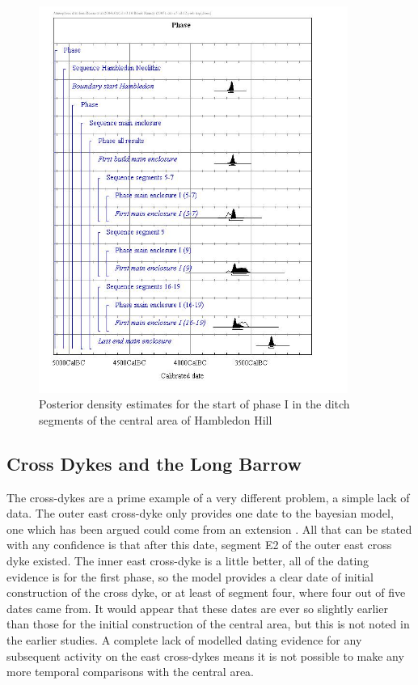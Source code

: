 \begin{figure}
\centering
	\includegraphics[width=0.9\textwidth]{figures/central-phasei-model}
  \caption{Posterior density estimates for the start of phase I in the ditch segments of the central area of Hambledon Hill}
  \label{fig:central-phasei-model}
\end{figure}

\subsection{Cross Dykes and the Long Barrow}
The cross-dykes are a prime example of a very different problem, a simple lack of data. The outer east cross-dyke only provides one date to the bayesian model, one which has been argued could come from an extension \citep[401]{Mercer:2008fk}. All that can be stated with any confidence is that after this date, segment E2 of the outer east cross dyke existed. The inner east cross-dyke is a little better, all of the dating evidence is for the first phase, so the model provides a clear date of initial construction of the cross dyke, or at least of segment four, where four out of five dates came from. It would appear that these dates are ever so slightly earlier than those for the initial construction of the central area, but this is not noted in the earlier studies. A complete lack of modelled dating evidence for any subsequent activity on the east cross-dykes means it is not possible to make any more temporal comparisons with the central area. 

